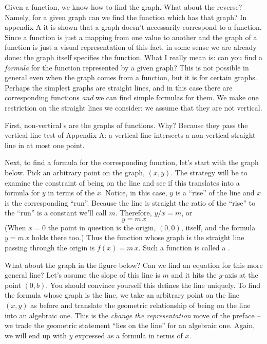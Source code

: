 %
%

Given a function, we know how to find the graph. What about the reverse?
Namely, for a given graph can we find the function which has that graph?
In appendix A it is shown that a graph doesn't necessarily correspond to 
a function. Since a function is just a mapping from one value to another
and the graph of a function is just a visual representation of this fact,
in some sense we are already done: the graph itself specifies the function.
What I really mean is: can you find a {\it formula\/} for the function
represented by a given graph? This is not possible in general even when 
the graph comes from a function, but it is 
for certain graphs. Perhaps the simplest graphs are straight lines, and in 
this case there are corresponding functions {\it and\/} we can find 
simple formulas for them. We make one restriction on the straight lines 
we consider: we assume that they are not vertical.

First, non-vertical s are the graphs of functions. Why? Because they pass
the vertical line test of Appendix A: a vertical line
intersects a non-vertical straight line in at most one point.

Next, to find a formula for the corresponding function, let's start with 
the graph below. Pick an arbitrary point on the graph, 
$(x,y)$. 
The strategy will be to examine the constraint of being on the line 
and see if this translates into a formula for $y$ in terms of the $x$.
Notice, in 
this case, $y$ is a ``rise'' of the line and $x$ is the 
corresponding ``run''. Because the line is straight the ratio 
of the ``rise'' to the ``run'' is a constant we'll call $m$. 
Therefore, $y/x = m$, or
$$
y = m\,x
$$
(When $x = 0$ the point in question is the origin, $(0,0)$, itself,
and the formula $y = m\,x$ holds there too.)
Thus the function whose graph is the straight line passing
through the origin is $f(x) = m\, x$.
Such a function is called a {\it {}\/}.

What about the graph in the figure below? 
Can we find an equation for this 
more general line? Let's assume the slope of this line is $m$ and  
it hits the $y$-axis at the point $(0,b)$. You should convince yourself 
this defines the line uniquely. To find the formula whose graph is
the line, 
we take an arbitrary point on the line $(x,y)$ as before and translate
the geometric relationship of being on the line into an algebraic one.
This is the {\it change the representation\/} move of the preface -- we
trade the geometric statement ``lies on the line'' for an algebraic one.
Again, we will end up with $y$ expressed as a
formula in terms of $x$.

